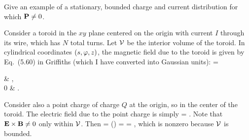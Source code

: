 \begin{problem}
	Give an example of a stationary, bounded charge and current distribution for which $\vb{P} \neq 0$.
\end{problem}

\begin{solution}
	Consider a toroid in the $xy$ plane centered on the origin with current $I$ through its wire, which has $N$ total turns.  Let $\mathcal{V}$ be the interior volume of the toroid.  In cylindrical coordinates $(s, \varphi, z)$, the magnetic field due to the toroid is given by Eq.~(5.60) in Griffiths (which I have converted into Gaussian units):
	\beq
		\vBx = \begin{cases}
			 \phh & \vx \in \cV, \\[2ex]
			0 & \vx \not\in \cV.
		\end{cases}
	\eeq
	Consider also a point charge of charge $Q$ at the origin, so in the center of the toroid.  The electric field due to the point charge is simply
	\beq
		\vE =  \rh.
	\eeq
	Note that $\vb{E} \times \vb{B} \neq 0$ only within $\mathcal{V}$.  Then
	\beq
		\vP =  \int (\vE \times \vB) \dcx
		=  \intcV {} \dcx
		=  \zh \intcV {},
	\eeq
	which is nonzero because $\mathcal{V}$ is bounded.
\end{solution}